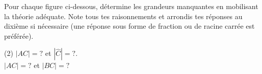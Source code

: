 %
%
    Pour chaque figure ci-dessous, détermine les grandeurs manquantes en mobilisant la théorie adéquate. Note tous tes raisonnements et arrondis tes réponses au dixième si nécessaire (une réponse sous forme de fraction ou de racine carrée est préférée).

    \begin{tasks}[after-item-skip=2cm](2)
        \task
        $|AC| = ?$ et $|\widehat{C}|=?$.\\

        \task
        $|AC|=?$ et $|BC|=?$
        \begin{center}
            
        \end{center}
    \end{tasks}
